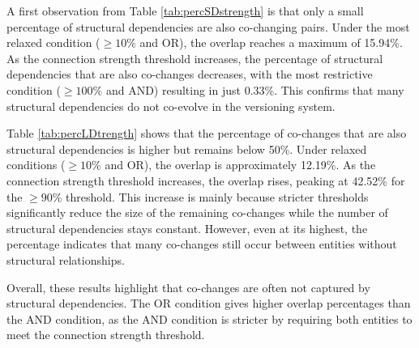 \begin{table}[!h]
\renewcommand{\arraystretch}{1}
\caption{Percentage of co-changing pairs that are structural dependencies (SD) after applying connection strength filtering and a commit size threshold of $cs \leq 10$.}
\label{tab:percLDtrength}
\centering
{}
\end{table}

A first observation from Table \ref{tab:percSDstrength} is that only a small percentage of structural dependencies are also co-changing pairs. Under the most relaxed condition (\(\geq 10\%\) and OR), the overlap reaches a maximum of 15.94\%. As the connection strength threshold increases, the percentage of structural dependencies that are also co-changes decreases, with the most restrictive condition (\(\geq 100\%\) and AND) resulting in just 0.33\%. This confirms that many structural dependencies do not co-evolve in the versioning system.

Table \ref{tab:percLDtrength} shows that the percentage of co-changes that are also structural dependencies is higher but remains below 50\%. Under relaxed conditions (\(\geq 10\%\) and OR), the overlap is approximately 12.19\%. As the connection strength threshold increases, the overlap rises, peaking at 42.52\% for the \(\geq 90\%\) threshold. This increase is mainly because stricter thresholds significantly reduce the size of the remaining co-changes while the number of structural dependencies stays constant. However, even at its highest, the percentage indicates that many co-changes still occur between entities without structural relationships.

Overall, these results highlight that co-changes are often not captured by structural dependencies. The OR condition gives higher overlap percentages than the AND condition, as the AND condition is stricter by requiring both entities to meet the connection strength threshold.



